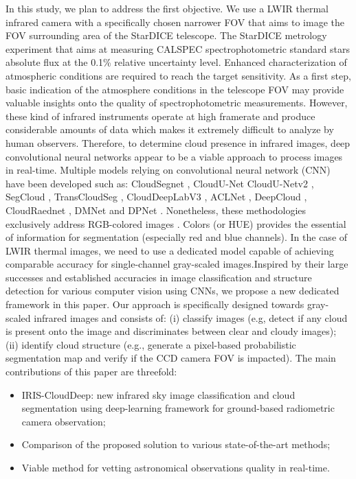\documentclass[amt, article]{copernicus}
\begin{document}
In this study, we plan to address the first objective. We use a LWIR thermal infrared camera with a specifically chosen narrower FOV that aims to image the FOV surrounding area of the StarDICE telescope. The StarDICE metrology experiment \citep{stardice1} that aims at measuring CALSPEC \citep{Bohlin2014} spectrophotometric standard stars absolute flux at the 0.1\% relative uncertainty level. Enhanced characterization of atmospheric conditions are required to reach the target sensitivity. As a first step, basic indication of the atmosphere conditions in the telescope FOV may provide valuable insights onto the quality of spectrophotometric measurements. However, these kind of infrared instruments operate at high framerate and produce considerable amounts of data which makes it extremely difficult to analyze by human observers. Therefore, to determine cloud presence in infrared images, deep convolutional neural networks appear to be a viable approach to process images in real-time. Multiple models relying on convolutional neural network (CNN) have been developed such as: CloudSegnet \citep{dev2019cloudsegnet}, CloudU-Net \citep{CloudUNet} CloudU-Netv2 \citep{CloudUNetv2}, SegCloud \citep{SegCloud}, TransCloudSeg \citep{TransCloudSeg}, CloudDeepLabV3 \citep{CloudDeepLabV3}, ACLNet \citep{makwana2022aclnet}, DeepCloud \citep{DeepCloud}, CloudRaednet \citep{shi2022cloudraednet}, DMNet \citep{DMNet} and DPNet \cite{DPNet}. Nonetheless, these methodologies exclusively address RGB-colored images \citep{HYTA, dev2016colorbased}. Colors (or HUE) provides the essential of information for segmentation (especially red and blue channels). In the case of LWIR thermal images, we need to use a dedicated model capable of achieving comparable accuracy for single-channel gray-scaled images.Inspired by their large successes and established accuracies in image classification and structure detection for various computer vision using CNNs, we propose a new dedicated framework in this paper. Our approach is specifically designed towards gray-scaled infrared images and consists of: (i) classify images (e.g, detect if any cloud is present onto the image and discriminates between clear and cloudy images); (ii) identify cloud structure (e.g., generate a pixel-based probabilistic segmentation map and verify if the CCD camera FOV is impacted).
The main contributions of this paper are threefold:

\begin{itemize}
    \item IRIS-CloudDeep: new infrared sky image classification and cloud segmentation using deep-learning framework for ground-based radiometric camera observation;
    \item Comparison of the proposed solution to various state-of-the-art methods;
    \item Viable method for vetting astronomical observations quality in real-time.
\end{itemize}
\end{document}
